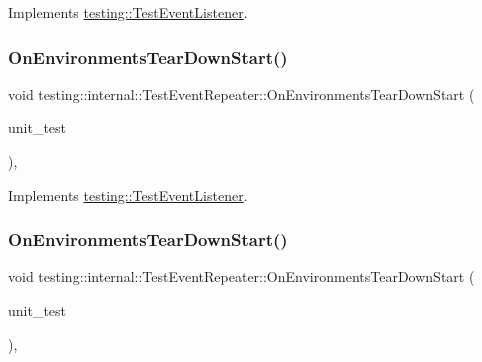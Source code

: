 Implements \mbox{\hyperlink{classtesting_1_1_test_event_listener_a468b5e6701bcb86cb2c956caadbba5e4}{testing\+::\+Test\+Event\+Listener}}.

\mbox{\label{classtesting_1_1internal_1_1_test_event_repeater_aa2bf25212c9b1c09ed80b2bbcf55dbba}} 
\subsubsection{\texorpdfstring{OnEnvironmentsTearDownStart()}{OnEnvironmentsTearDownStart()}\hspace{0.1cm}{\footnotesize\ttfamily [2/3]}}
{\footnotesize\ttfamily void testing\+::internal\+::\+Test\+Event\+Repeater\+::\+On\+Environments\+Tear\+Down\+Start (\begin{DoxyParamCaption}\item[{const \mbox{\hyperlink{classtesting_1_1_unit_test}{Unit\+Test}} \&}]{unit\+\_\+test }\end{DoxyParamCaption})\hspace{0.3cm}{\ttfamily [override]}, {\ttfamily [virtual]}}



Implements \mbox{\hyperlink{classtesting_1_1_test_event_listener_a468b5e6701bcb86cb2c956caadbba5e4}{testing\+::\+Test\+Event\+Listener}}.

\mbox{\label{classtesting_1_1internal_1_1_test_event_repeater_aa2bf25212c9b1c09ed80b2bbcf55dbba}} 
\subsubsection{\texorpdfstring{OnEnvironmentsTearDownStart()}{OnEnvironmentsTearDownStart()}\hspace{0.1cm}{\footnotesize\ttfamily [3/3]}}
{\footnotesize\ttfamily void testing\+::internal\+::\+Test\+Event\+Repeater\+::\+On\+Environments\+Tear\+Down\+Start (\begin{DoxyParamCaption}\item[{const \mbox{\hyperlink{classtesting_1_1_unit_test}{Unit\+Test}} \&}]{unit\+\_\+test }\end{DoxyParamCaption})\hspace{0.3cm}{\ttfamily [override]}, {\ttfamily [virtual]}}



